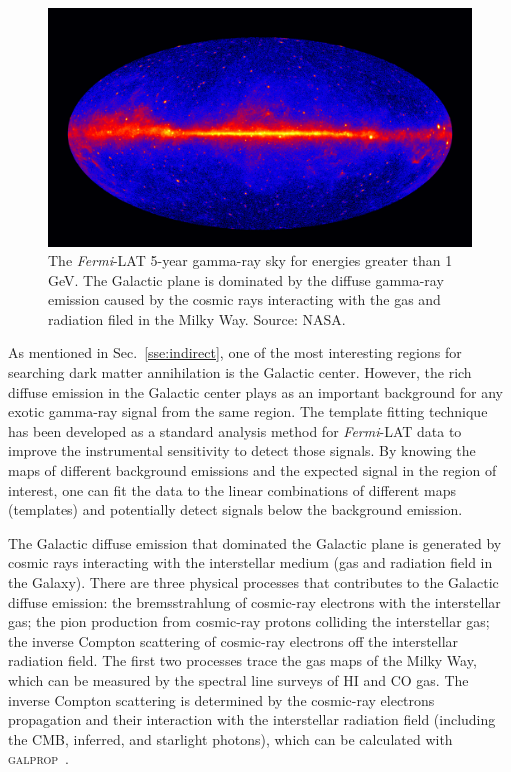 \documentclass[doublespace,nopageskip]{VTthesis} %
\begin{document}
\begin{figure}[htb]
    \centering
    \includegraphics[width=1\textwidth]{Figures/Intro/Femri_5_year_2500x1407.jpg}
    \caption{The \textit{Fermi}-LAT 5-year gamma-ray sky for energies greater than 1 GeV. The Galactic plane is dominated by the diffuse gamma-ray emission caused by the cosmic rays interacting with the gas and radiation filed in the Milky Way. Source: NASA.}
    \label{fig:gamma_sky}
\end{figure}

As mentioned in Sec.~\ref{sse:indirect}, one of the most interesting regions for searching dark matter annihilation is the Galactic center. However, the rich diffuse emission in the Galactic center plays as an important background for any exotic gamma-ray signal from the same region. The template fitting technique has been developed as a standard analysis method for \textit{Fermi}-LAT data to improve the instrumental sensitivity to detect those signals. By knowing the maps of different background emissions and the expected signal in the region of interest, one can fit the data to the linear combinations of different maps (templates) and potentially detect signals below the background emission.

The Galactic diffuse emission that dominated the Galactic plane is generated by cosmic rays interacting with the  interstellar medium (gas and radiation field in the Galaxy). There are three physical processes that contributes to the Galactic diffuse emission: the  bremsstrahlung of cosmic-ray electrons with the interstellar gas; the pion production from cosmic-ray protons colliding the interstellar gas; the inverse Compton scattering of cosmic-ray electrons off the interstellar radiation field. The first two processes trace the gas maps of the Milky Way, which can be measured by the spectral line surveys of HI and CO gas. The inverse Compton scattering is determined by the cosmic-ray electrons propagation and their interaction with the interstellar radiation field (including the CMB, inferred, and starlight photons), which can be calculated with \textsc{galprop}~\cite{2017ApJ...846...67P}.
\end{document}
